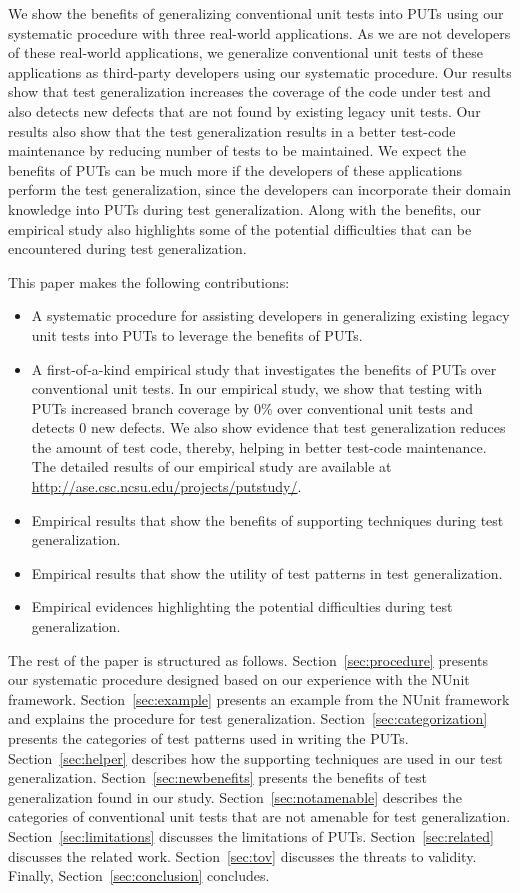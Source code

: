 We show the benefits of generalizing conventional unit tests into PUTs using our systematic procedure with three real-world applications. As we are not developers of these real-world applications, we generalize conventional unit tests of these applications as third-party developers using our systematic procedure. Our results show that test generalization increases the coverage of the code under test and also detects new defects that are not found by existing legacy unit tests. Our results also show that the test generalization results in a better test-code maintenance by reducing number of tests to be maintained. We expect the benefits of PUTs can be much more if the developers of these applications perform the test generalization, since the developers can incorporate their domain knowledge into PUTs during test generalization. Along with the benefits, our empirical study also highlights some of the potential difficulties that can be encountered during test generalization.

This paper makes the following contributions:

\begin{itemize}
	\item A systematic procedure for assisting developers in generalizing existing legacy unit tests into PUTs to leverage the benefits of PUTs.
	\item A first-of-a-kind empirical study that investigates the benefits of PUTs over conventional unit tests. In our empirical study, we show that testing with PUTs increased branch coverage by $0$\% over conventional unit tests and detects $0$ new defects. We also show evidence that test generalization reduces the amount of test code, thereby, helping in better test-code maintenance. The detailed results of our empirical study are available at \url{http://ase.csc.ncsu.edu/projects/putstudy/}.	
	\item Empirical results that show the benefits of supporting techniques during test generalization. 
	\item Empirical results that show the utility of test patterns in test generalization.
	\item Empirical evidences highlighting the potential difficulties during test generalization.
\end{itemize}

The rest of the paper is structured as follows. 
Section~\ref{sec:procedure} presents our systematic procedure designed based on our experience with the NUnit framework. 
Section~\ref{sec:example} presents an example from the NUnit framework and explains the procedure for test generalization.  
Section~\ref{sec:categorization} presents the categories of test patterns used in writing the PUTs. 
Section~\ref{sec:helper} describes how the supporting techniques are used in our test generalization. 
Section~\ref{sec:newbenefits} presents the benefits of test generalization found in our study. 
Section~\ref{sec:notamenable} describes the categories of conventional unit tests that are not amenable for test generalization.
Section~\ref{sec:limitations} discusses the limitations of PUTs. Section~\ref{sec:related} discusses the related work. Section~\ref{sec:tov} discusses the threats to validity. Finally, Section~\ref{sec:conclusion} concludes.